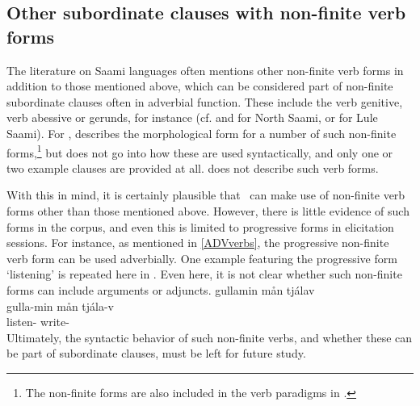 \subsection{Other subordinate clauses with non-finite verb forms}\label{otherSubclauses}
The literature on Saami languages often mentions other non-finite verb forms in addition to those mentioned above, which can be considered part of non-finite subordinate clauses often in adverbial function. These include the verb genitive, verb abessive or gerunds, for instance (cf. \citet[103-104]{Sammallahti1998} and \citet[67-73]{Svonni2009} for North Saami, or \citet[104-111]{Spiik1989} for Lule Saami). 
For \PS, \citet[95-106]{Lehtiranta1992} describes the morphological form for a number of such non-finite forms,\footnote{The non-finite forms are also included in the verb paradigms in \citet[150-155]{Lehtiranta1992}.} 
but does not go into how these are used syntactically, and only one or two example clauses are provided at all. \citet{Lagercrantz1926} does not describe such verb forms. 

With this in mind, it is certainly plausible that \PS\ can make use of non-finite verb forms other than those mentioned above. However, there is little evidence of such forms in the corpus, and even this is limited to progressive forms in elicitation sessions. For instance, as mentioned in \SEC\ref{ADVverbs}, the progressive non-finite verb form can be used adverbially. One example featuring the progressive form  ‘listening’ is repeated here in . Even here, it is not clear whether such non-finite forms can include arguments or adjuncts. 
\ea\label{ADVverbsEx2repeat}%
\glll	gullamin mån tjálav\\
	gulla-min mån tjála-v\\
	listen-  write-\\\nopagebreak
{}	
\z
Ultimately, the syntactic behavior of such non-finite verbs, and whether these can be part of subordinate clauses, must be left for future study.  




